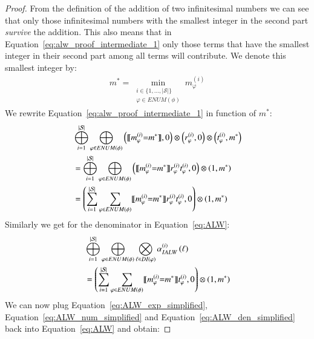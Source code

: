\begin{proof}
    From the definition of the addition of two infinitesimal numbers we can see that only those infinitesimal numbers with the smallest integer in the second part {\em survive} the addition. This also means that in Equation~\ref{eq:alw_proof_intermediate_1} only those terms that have the smallest integer in their second part among all terms will contribute. We denote this smallest integer by:
    \begin{align}
        m^* =  \min_{ \substack{i\in \{ 1, \dots,  \lvert \mathcal{S} \rvert \} \\ \varphi\in ENUM(\phi) }} m^{(i)}_\varphi
    \end{align}
    We rewrite Equation~\ref{eq:alw_proof_intermediate_1} in function of $m^*$:
    \begin{align}
         & \bigoplus_{i=1}^{ \lvert \mathcal{S} \rvert}  \bigoplus_{\varphi \in ENUM(\phi)}
        \left(  \llbracket m_{\varphi}^{(i)}{=} m^* \rrbracket , 0  \right) \otimes
        \left( r_\varphi^{(i)} , 0  \right) \otimes
        \left( t_\varphi^{(i)} , m^*  \right)                                                                              \\
         & =
        \bigoplus_{i=1}^{ \lvert \mathcal{S} \rvert}  \bigoplus_{\varphi \in ENUM(\phi)}
        \left( \llbracket m_{\varphi}^{(i)}{=} m^* \rrbracket r_\varphi^{(i)}  t_\varphi^{(i)} , 0  \right) \otimes \left( 1, m^* \right) \\
         & =
        \left( \sum_{i=1}^{ \lvert \mathcal{S} \rvert}  \sum_{\varphi \in ENUM(\phi)}  \llbracket m_{\varphi}^{(i)}{=} m^* \rrbracket r_\varphi^{(i)}  t_\varphi^{(i)} , 0   \right)  \otimes \left( 1, m^* \right) \label{eq:ALW_num_simplified}
    \end{align}
    Similarly we get for the denominator in Equation~\ref{eq:ALW}:
    \begin{align}
         & \bigoplus_{i=1}^{ \lvert \mathcal{S} \rvert}  \bigoplus_{\varphi \in ENUM(\phi)} \bigotimes_{\ell \in  DI(\varphi)}  \alpha_{IALW}^{(i)} \left(\ell \right) \\
         & =
        \left( \sum_{i=1}^{ \lvert \mathcal{S} \rvert}  \sum_{\varphi\in ENUM(\phi)}  \llbracket m_{\varphi}^{(i)}{=} m^* \rrbracket  t_\varphi^{(i)} , 0   \right)  \otimes \left( 1, m^* \right)  \label{eq:ALW_den_simplified}
    \end{align}
    We can now plug Equation~\ref{eq:ALW_exp_simplified}, Equation~\ref{eq:ALW_num_simplified} and Equation~\ref{eq:ALW_den_simplified} back into Equation~\ref{eq:ALW} and obtain:


\end{proof}
